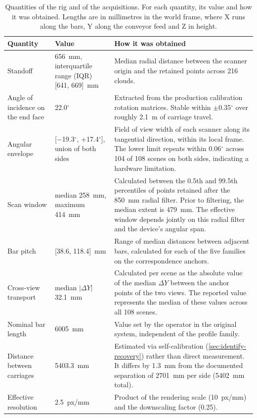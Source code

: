 \documentclass[a4paper, 12pt, twoside]{book}
\begin{document}
\begin{table}[htbp]
\centering
\caption[Quantities of the rig and of the acquisitions]{Quantities of the rig and of the acquisitions. For each quantity, its value and how it was obtained. Lengths are in millimetres in the world frame, where X runs along the bars, Y along the conveyor feed and Z in height.}
\label{tab:rig-quantities}
\begin{tabular}{@{}p{3.3cm}p{3.3cm}p{7.4cm}@{}}
\toprule
Quantity & Value & How it was obtained \\
\midrule
Standoff & 656~mm, interquartile range (IQR) [641, 669]~mm & Median radial distance between the scanner origin and the retained points across 216 clouds. \\
Angle of incidence on the end face & 22.0$^\circ$ & Extracted from the production calibration rotation matrices. Stable within $\pm$0.35$^\circ$ over roughly 2.1~m of carriage travel. \\
Angular envelope & [$-$19.3$^\circ$, $+$17.4$^\circ$], union of both sides & Field of view width of each scanner along its tangential direction, within its local frame. The lower limit repeats within 0.06$^\circ$ across 104 of 108 scenes on both sides, indicating a hardware limitation. \\
Scan window & median 258~mm, maximum 414~mm & Calculated between the 0.5th and 99.5th percentiles of points retained after the 850~mm radial filter. Prior to filtering, the median extent is 479~mm. The effective window depends jointly on this radial filter and the device's angular span. \\
Bar pitch & [38.6, 118.4]~mm & Range of median distances between adjacent bars, calculated for each of the five families on the correspondence anchors. \\
Cross-view transport & median $|\Delta Y|$ 32.1~mm & Calculated per scene as the absolute value of the median $\Delta Y$ between the anchor points of the two views. The reported value represents the median of these values across all 108 scenes. \\
Nominal bar length & 6005~mm & Value set by the operator in the original system, independent of the profile family. \\
Distance between carriages & 5403.3~mm & Estimated via self-calibration (\cref{sec:identify-recovery}) rather than direct measurement. It differs by 1.3~mm from the documented separation of 2701~mm per side (5402~mm total). \\
Effective resolution & 2.5~px/mm & Product of the rendering scale (10~px/mm) and the downscaling factor (0.25). \\
\bottomrule
\end{tabular}
\end{table}
\end{document}
